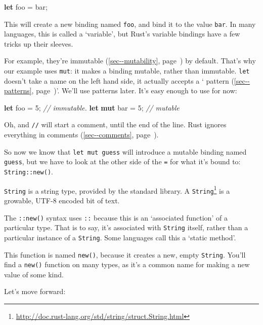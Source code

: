 \documentclass[a4paper,]{book}
\renewcommand*{\hyperref}[2][\ar]{%
  \def\ar{#2}%
  #2 (\autoref{#1}, page~\pageref{#1})}
\newenvironment{Shaded}{\begin{snugshade}}{\end{snugshade}}
\newcommand{\KeywordTok}[1]{\textcolor[rgb]{0.13,0.29,0.53}{\textbf{{#1}}}}
\newcommand{\DecValTok}[1]{\textcolor[rgb]{0.00,0.00,0.81}{{#1}}}
\newcommand{\CommentTok}[1]{\textcolor[rgb]{0.56,0.35,0.01}{\textit{{#1}}}}
\newcommand{\NormalTok}[1]{{#1}}
\renewcommand{\href}[2]{#2\footnote{\url{#1}}}
\begin{document}
\begin{Shaded}
\begin{Highlighting}[]
\KeywordTok{let} \NormalTok{foo = bar;}
\end{Highlighting}
\end{Shaded}

This will create a new binding named \texttt{foo}, and bind it to the
value \texttt{bar}. In many languages, this is called a `variable', but
Rust's variable bindings have a few tricks up their sleeves.

For example, they're \hyperref[sec--mutability]{immutable} by default.
That's why our example uses \texttt{mut}: it makes a binding mutable,
rather than immutable. \texttt{let} doesn't take a name on the left hand
side, it actually accepts a `\hyperref[sec--patterns]{pattern}'. We'll
use patterns later. It's easy enough to use for now:

\begin{Shaded}
\begin{Highlighting}[]
\KeywordTok{let} \NormalTok{foo = }\DecValTok{5}\NormalTok{; }\CommentTok{// immutable.}
\KeywordTok{let} \KeywordTok{mut} \NormalTok{bar = }\DecValTok{5}\NormalTok{; }\CommentTok{// mutable}
\end{Highlighting}
\end{Shaded}

Oh, and \texttt{//} will start a comment, until the end of the line.
Rust ignores everything in \hyperref[sec--comments]{comments}.

So now we know that \texttt{let\ mut\ guess} will introduce a mutable
binding named \texttt{guess}, but we have to look at the other side of
the \texttt{=} for what it's bound to: \texttt{String::new()}.

\texttt{String} is a string type, provided by the standard library. A
\href{http://doc.rust-lang.org/std/string/struct.String.html}{\texttt{String}}
is a growable, UTF-8 encoded bit of text.

The \texttt{::new()} syntax uses \texttt{::} because this is an
`associated function' of a particular type. That is to say, it's
associated with \texttt{String} itself, rather than a particular
instance of a \texttt{String}. Some languages call this a `static
method'.

This function is named \texttt{new()}, because it creates a new, empty
\texttt{String}. You'll find a \texttt{new()} function on many types, as
it's a common name for making a new value of some kind.

Let's move forward:
\end{document}
